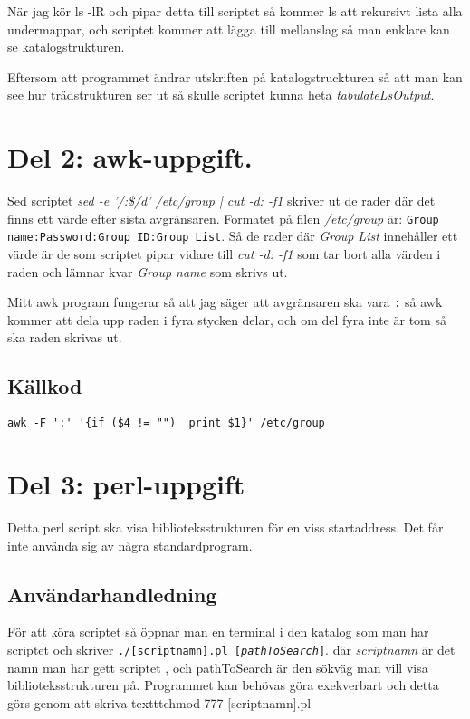 \documentclass[11pt, titlepage, oneside, a4paper]{article}
\newcommand{\Section}[1]{\section{#1}\vspace{-8pt}}
\newcommand{\Subsection}[1]{\vspace{-4pt}\subsection{#1}\vspace{-8pt}}
\begin{document}
	När jag kör ls -lR och pipar detta till scriptet så kommer ls att rekursivt lista alla undermappar, och scriptet kommer att lägga till mellanslag så man enklare kan se katalogstrukturen.
	
	Eftersom att programmet ändrar utskriften på katalogstruckturen så att man kan see hur trädstrukturen  ser ut så skulle scriptet kunna heta \emph{tabulateLsOutput}.
	
	
	\Section{Del 2: awk-uppgift.}
	
	Sed scriptet \emph{sed -e '/:\$/d' /etc/group | cut -d: -f1} skriver ut de rader där det finns ett värde efter sista avgränsaren. Formatet på filen \emph{/etc/group} är: \texttt{Group name:Password:Group ID:Group List}.
	Så de rader där \emph{Group List} innehåller ett värde är de som scriptet pipar vidare till \emph{cut -d: -f1} som tar bort alla värden i raden och lämnar kvar \emph{Group name} som skrivs ut.
	
	Mitt awk program fungerar så att jag säger att avgränsaren ska vara \texttt{:} så awk kommer att dela upp raden i fyra stycken delar, och om del fyra inte är tom så ska raden skrivas ut.
	
	\Subsection{Källkod}
	\begin{lstlisting}
awk -F ':' '{if ($4 != "")  print $1}' /etc/group
	\end{lstlisting}

	

	
	
	\Section{Del 3: perl-uppgift}	
	Detta perl script ska visa biblioteksstrukturen för en viss startaddress. Det får inte använda sig av några standardprogram.
	\Subsection{Användarhandledning}
	För att köra scriptet så öppnar man en terminal i den katalog som man har scriptet och skriver \texttt{./[scriptnamn].pl [\emph{pathToSearch}]}. där \emph{scriptnamn} är det namn man har gett scriptet
, och pathToSearch är den sökväg man vill visa biblioteksstrukturen på. Programmet kan behövas göra exekverbart och detta görs genom att skriva texttt{chmod 777 [scriptnamn].pl}
\end{document}
